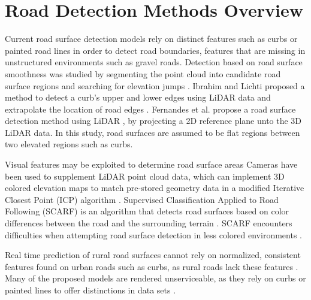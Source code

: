 \documentclass[numbered,pdftex]{ohio-etd}
\begin{document}
{	\section{Road Detection Methods Overview}{
	
		{Current road surface detection models rely on distinct features such as curbs or painted road lines in order to detect road boundaries, features that are missing in unstructured environments such as gravel roads. Detection based on road surface smoothness was studied by segmenting the point cloud into candidate road surface regions and searching for elevation jumps \cite{liu_new_2013}. Ibrahim and Lichti proposed a method to detect a curb's upper and lower edges using LiDAR data and extrapolate the location of road edges \cite{ibrahim_curb-based_2012}. Fernandes et al. propose a road surface detection method using LiDAR \cite{fernandes_road_2014}, by projecting a 2D reference plane unto the 3D LiDAR data. In this study, road surfaces are assumed to be flat regions between two elevated regions such as curbs.  }


			
		{Visual features may be exploited to determine road surface areas Cameras have been used to supplement LiDAR point cloud data, which can implement 3D colored elevation maps to match pre-stored geometry data in a modified Iterative Closest Point (ICP) algorithm \cite{manz_detection_2011}. Supervised Classification Applied to Road Following (SCARF) is an algorithm that detects road surfaces based on color differences between the road and the surrounding terrain \cite{crisman_scarf_1993}. SCARF encounters difficulties when attempting road surface detection in less colored environments \cite{crisman_scarf_1993,manz_detection_2011}.}
		
		{Real time prediction of rural road surfaces cannot rely on normalized, consistent features found on urban roads such as curbs, as rural roads lack these features \cite{skorseth_gravel_nodate}. Many of the proposed models are rendered unserviceable, as they rely on curbs or painted lines to offer distinctions in data sets \cite{yadav_extraction_2017,liu_new_2013,qiu_fast_2016,fernandes_road_2014,seker_experiments_nodate,yang_semi-automated_2013,miyazaki_line-based_2014,hervieu_road_2013,smadja_road_nodate}.} 
		
}}
\end{document}
